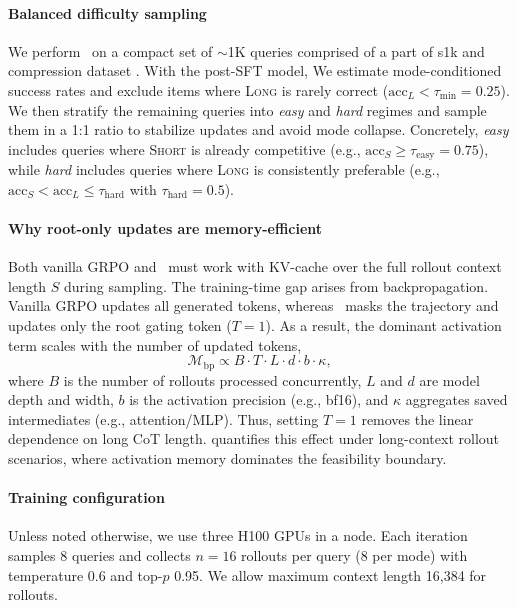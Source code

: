 \paragraph{Balanced difficulty sampling}
We perform \Ours~on a compact set of $\sim$1K queries comprised of a part of s1k \cite{muennighoff2025s1} and compression dataset \cite{arora2025training}.
With the post-SFT model, We estimate mode-conditioned success rates and exclude items where \textsc{Long} is rarely correct ($\mathrm{acc}_{L}{<}\tau_{\min}{=}0.25$).
We then stratify the remaining queries into \textit{easy} and \textit{hard} regimes and sample them in a 1:1 ratio to stabilize updates and avoid mode collapse.
Concretely, \textit{easy} includes queries where \textsc{Short} is already competitive (e.g., $\mathrm{acc}_{S}{\ge} \tau_{\text{easy}}{=}0.75$), while \textit{hard} includes queries where \textsc{Long} is consistently preferable (e.g., $\mathrm{acc}_{S}{<}\mathrm{acc}_{L}{\le} \tau_{\text{hard}}$ with $\tau_{\text{hard}}{=}0.5$).

\paragraph{Why root-only updates are memory-efficient} 
Both vanilla GRPO and \Ours\ must work with KV-cache over the full rollout context length $S$ during sampling. The training-time gap arises from backpropagation. Vanilla GRPO updates all generated tokens, whereas \Ours\ masks the trajectory and updates only the root gating token ($T{=}1$). As a result, the dominant activation term scales with the number of updated tokens,
\[
\mathcal{M}_{\text{bp}} \propto B \cdot T \cdot L \cdot d \cdot b \cdot \kappa,
\]
where $B$ is the number of rollouts processed concurrently, $L$ and $d$ are model depth and width, $b$ is the activation precision (e.g., bf16), and $\kappa$ aggregates saved intermediates (e.g., attention/MLP). Thus, setting $T{=}1$ removes the linear dependence on long CoT length.
 quantifies this effect under long-context rollout scenarios, where activation memory dominates the feasibility boundary.

\paragraph{Training configuration}
Unless noted otherwise, we use three H100 GPUs in a node.
Each iteration samples 8 queries and collects $n{=}16$ rollouts per query (8 per mode) with temperature 0.6 and top-$p$ 0.95. We allow maximum context length 16,384 for rollouts.

